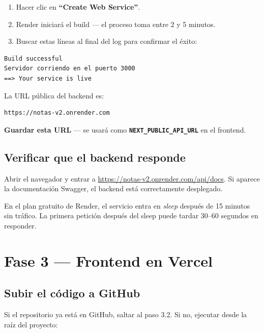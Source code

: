 \documentclass[12pt, a4paper]{article}
\newcommand{\var}[1]{\texttt{\textbf{#1}}}
\begin{document}
\begin{enumerate}
    \item Hacer clic en \textbf{``Create Web Service''}.
    \item Render iniciará el build --- el proceso toma entre 2 y 5 minutos.
    \item Buscar estas líneas al final del log para confirmar el éxito:
\end{enumerate}

\begin{lstlisting}[style=texto]
Build successful
Servidor corriendo en el puerto 3000
==> Your service is live
\end{lstlisting}

La URL pública del backend es:

\begin{lstlisting}[style=texto]
https://notas-v2.onrender.com
\end{lstlisting}

\textbf{Guardar esta URL} --- se usará como \var{NEXT\_PUBLIC\_API\_URL} en el frontend.

\subsection{Verificar que el backend responde}

Abrir el navegador y entrar a \url{https://notas-v2.onrender.com/api/docs}. Si aparece la documentación Swagger, el backend está correctamente desplegado.

\begin{nota}
    En el plan gratuito de Render, el servicio entra en \textit{sleep} después de 15 minutos sin tráfico. La primera petición después del sleep puede tardar 30--60 segundos en responder.
\end{nota}

\newpage
\section{Fase 3 --- Frontend en Vercel}

\subsection{Subir el código a GitHub}

Si el repositorio ya está en GitHub, saltar al paso 3.2. Si no, ejecutar desde la raíz del proyecto:
\end{document}
